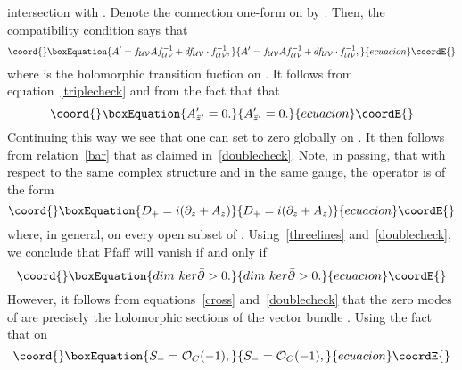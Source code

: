 \documentclass[a4paper,12pt]{article}
\numberwithin{equation}{section}
\theoremstyle{plain}
\begin{document}
intersection with \coordHE{}. Denote the connection one-form on
\coordHE{} by
\coordHE{}.
Then, the compatibility condition says that
%
\begin{equation}\coord{}\boxEquation{
A^{\prime} = f_{{\cal{U}}{\cal{V}}}Af^{-1}_{{\cal{U}}{\cal{V}}} +
df_{{\cal{U}}{\cal{V}}} \cdot f^{-1}_{{\cal{U}}{\cal{V}}},
\label{22}
}{
A^{\prime} = f_{{\cal{U}}{\cal{V}}}Af^{-1}_{{\cal{U}}{\cal{V}}} +
df_{{\cal{U}}{\cal{V}}} \cdot f^{-1}_{{\cal{U}}{\cal{V}}},
}{ecuacion}\coordE{}\end{equation}
%
where \coordHE{} is the holomorphic transition fuction on
\coordHE{}.
It follows from equation~\eqref{triplecheck} and from the fact that
\coordHE{} that
%
\begin{equation}\coord{}\boxEquation{
A^{\prime}_{\bar z^{\prime}}=0.
\label{23}
}{
A^{\prime}_{\bar z^{\prime}}=0.
}{ecuacion}\coordE{}\end{equation}
%
Continuing this way we see that one can set \coordHE{} to zero globally
on \coordHE{}. It then follows from relation~\eqref{bar} that
\coordHE{} as claimed in~\eqref{doublecheck}. Note, in
passing,
that with respect to the same complex structure and in the same gauge,
the operator \coordHE{} is of the form
%
\begin{equation}\coord{}\boxEquation{
D_{+} = i(\partial_{z} + A_{z})
\label{24}
}{
D_{+} = i(\partial_{z} + A_{z})
}{ecuacion}\coordE{}\end{equation}
%
where, in general, \coordHE{} on every open subset of \coordHE{}.
Using~\eqref{threelines} and~\eqref{doublecheck}, we conclude that
Pfaff\coordHE{} will vanish if and only if
%
\begin{equation}\coord{}\boxEquation{
dim{\ } ker \bar \partial >0.
\label{25}
}{
dim{\ } ker \bar \partial >0.
}{ecuacion}\coordE{}\end{equation}
%
However, it follows from equations~\eqref{cross} and~\eqref{doublecheck}
that
the zero modes of \myHighlight{$\bar \partial$}\coordHE{} are precisely the holomorphic sections
of the vector bundle \coordHE{}. Using the fact that
on \coordHE{}
%
\begin{equation}\coord{}\boxEquation{
S_{-} ={\cal O}_{C}(-1),
\label{26}
}{
S_{-} ={\cal O}_{C}(-1),
}{ecuacion}\coordE{}\end{equation}
\end{document}
